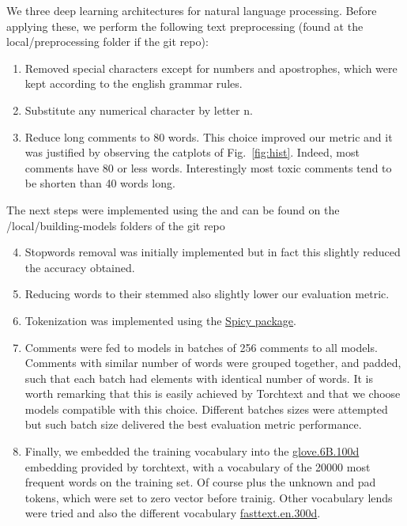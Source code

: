 \documentclass{report}
\begin{document}
We three deep learning architectures for natural
language processing. Before applying these, we perform the following 
text preprocessing (found at the local/preprocessing folder if the git repo):
\begin{enumerate}
\item Removed special characters except for numbers and apostrophes, which
were kept according to the english grammar rules.
\item Substitute any numerical character by letter n.
\item Reduce long comments to 80 words. This choice improved our metric 
and it was justified by observing the catplots of Fig.~\ref{fig:hist}. Indeed, 
most comments have 80 or less words. Interestingly most toxic comments tend 
to be shorten than 40 words long.
\end{enumerate}
The next steps were implemented using the \cite{Torchtext} and 
can be found on the /local/building-models folders of the git repo
\begin{enumerate}
 \setcounter{enumi}{3}
\item Stopwords removal was initially implemented but in fact this slightly reduced the
accuracy obtained. 
\item Reducing words to their stemmed also slightly lower our evaluation metric.
\item Tokenization was implemented using the \href{https://scipy.org/scipylib/}{Spicy package}.
\item Comments were fed to models in batches of 256 comments to all models. Comments
 with similar number of words were grouped together, and padded, such that 
each batch had elements with identical number of words. It is worth remarking that this is
easily achieved by Torchtext and that we choose models compatible with this choice. Different 
batches sizes were attempted but such batch size delivered the best evaluation metric performance. 

\item Finally, we embedded the training vocabulary into the 
\href{https://nlp.stanford.edu/projects/glove/}{glove.6B.100d} embedding 
provided by torchtext, with a vocabulary of the 20000 most frequent words on the
training set. Of course plus the unknown and pad tokens, which were set to zero vector before trainig. 
Other vocabulary lends were tried and also the different vocabulary \href{https://fasttext.cc/}{fasttext.en.300d}. 

\end{enumerate}
\end{document}
